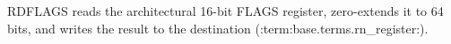 RDFLAGS reads the architectural 16-bit FLAGS register, zero-extends it to 64 bits, and writes the result to the destination (:term:base.terms.rn_register:).

